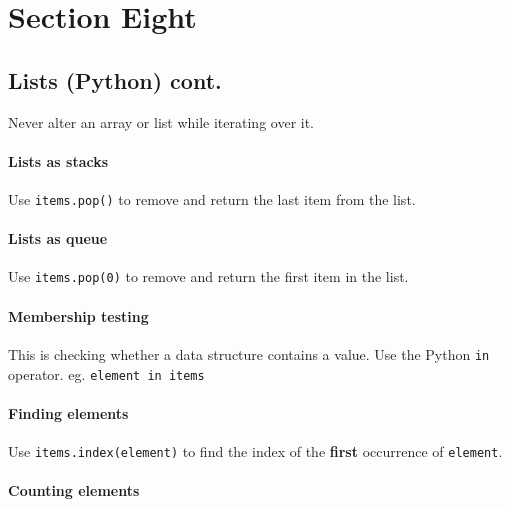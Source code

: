 \section{Section Eight}\label{sec:section_eight}

\subsection{Lists (Python) cont.}\label{sub:lists_python_cont_}

\begin{note}
	Never alter an array or list while iterating over it.
\end{note}

\paragraph{Lists as stacks}\label{par:lists_as_stacks}

Use \texttt{items.pop()} to remove and return the last item from the list.

\paragraph{Lists as queue}\label{par:lists_as_queue}

Use \texttt{items.pop(0)} to remove and return the first item in the list.

\paragraph{Membership testing}\label{par:membership_testing}

This is checking whether a data structure contains a value.
Use the Python \texttt{in} operator.
eg. \texttt{element in items}

\paragraph{Finding elements}\label{par:finding_elements}

Use \texttt{items.index(element)} to find the index of the \textbf{first} occurrence of \texttt{element}.

\paragraph{Counting elements}\label{par:counting_elements}

